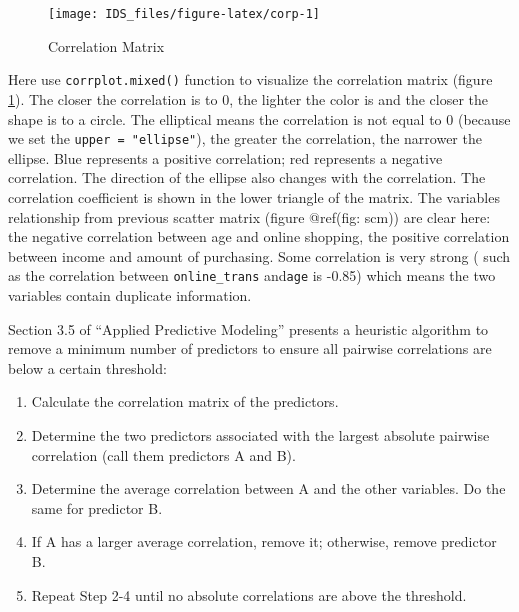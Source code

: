 \documentclass[12pt,]{krantz}
\providecommand{\tightlist}{%
  \setlength{\itemsep}{0pt}\setlength{\parskip}{0pt}}
\renewenvironment{quote}{\begin{VF}}{\end{VF}}
\theoremstyle{definition}
\theoremstyle{definition}
\theoremstyle{remark}
\begin{document}
\begin{figure}

{\centering \texttt{[image: IDS\_files/figure-latex/corp-1]} 

}

\caption{Correlation Matrix}\label{fig:corp}
\end{figure}

Here use \texttt{corrplot.mixed()} function to visualize the correlation
matrix (figure \ref{fig:corp}). The closer the correlation is to 0, the
lighter the color is and the closer the shape is to a circle. The
elliptical means the correlation is not equal to 0 (because we set the
\texttt{upper\ =\ "ellipse"}), the greater the correlation, the narrower
the ellipse. Blue represents a positive correlation; red represents a
negative correlation. The direction of the ellipse also changes with the
correlation. The correlation coefficient is shown in the lower triangle
of the matrix. The variables relationship from previous scatter matrix
(figure @ref(fig: scm)) are clear here: the negative correlation between
age and online shopping, the positive correlation between income and
amount of purchasing. Some correlation is very strong ( such as the
correlation between \texttt{online\_trans} and\texttt{age} is -0.85)
which means the two variables contain duplicate information.

Section 3.5 of ``Applied Predictive Modeling'' \citep{APM} presents a
heuristic algorithm to remove a minimum number of predictors to ensure
all pairwise correlations are below a certain threshold:

\begin{quote}
\begin{enumerate}
\def\labelenumi{(\arabic{enumi})}
\tightlist
\item
  Calculate the correlation matrix of the predictors.
\item
  Determine the two predictors associated with the largest absolute
  pairwise correlation (call them predictors A and B).
\item
  Determine the average correlation between A and the other variables.
  Do the same for predictor B.
\item
  If A has a larger average correlation, remove it; otherwise, remove
  predictor B.
\item
  Repeat Step 2-4 until no absolute correlations are above the
  threshold.
\end{enumerate}
\end{quote}
\end{document}
